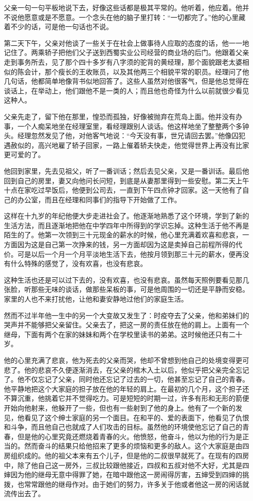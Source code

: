 \par 父亲一句一句平板地说下去，好像这些话都是极其平常的。他听着，他应着。他并不说他愿意或是不愿意。一个念头在他的脑子里打转：“一切都完了。”他的心里藏着不少的话，可是他一句话也不说。
\par 第二天下午，父亲对他谈了一些关于在社会上做事待人应取的态度的话，他一一地记住了。两乘轿子把他们父子送到西蜀实业公司经营的商业场的后门。他跟着父亲走到事务所去，见了那个四十多岁有八字须的驼背的黄经理，那个面貌跟老太婆相似的陈会计，那个瘦长的王收账员，以及其他两三个相貌平常的职员。经理问了他几句话，他都简单地像背书似地回答了。这些人虽然对他很客气，但是他总觉得在谈话上，在举动上，他们跟他不是一类的人；而且他也奇怪为什么以前就很少看见这种人。
\par 父亲先走了，留下他在那里，惶恐而孤独，好像被抛弃在荒岛上面。他并没有办事，一个人痴呆地坐在经理室里，看经理跟别人谈话。他这样地坐了整整两个多钟头。经理忽然发见了他，对他客气地说：“今天没有事，世兄请回去罢。”他像囚犯遇赦似的，高兴地雇了轿子回家，一路上催着轿夫快走，他觉得世界上再没有比家更可爱的了。
\par 他回到家里，先去见祖父，听了一番训话；然后去见父亲，又是一番训话。最后他回到自己的房里，妻又向他问长问短，到底是从妻那里得到一些安慰。第二天上午十点在家吃过早饭后，他便到公司去，一直到下午四点钟才回家。这一天他有了自己的办公室，而且在经理和同事们的指导下开始做了工作。
\par 这样在十九岁的年纪他便大步走进社会了。他逐渐地熟悉了这个环境，学到了新的生活方法，而且逐渐地把他在中学四年中所得到的学识忘掉。这种生活于他不再是陌生的了。他第一次领到三十元现金的薪水的时候，他心里充满着欢喜和悲哀，一方面因为这是自己第一次挣来的钱，另一方面却因为这是卖掉自己前程所得的代价。可是以后一个月一个月平淡地生活下去，他按月领到那三十元的薪水，便再没有什么特殊的感觉了，没有欢喜，也没有悲哀。
\par 这种生活也还是可以过下去的，没有欢喜，也没有悲哀。虽然每天照例要看见那几张脸，听那些无味的谈话，做那些呆板的事，可是他周围的一切还是平静而安稳。家里的人也不来打扰他，让他和妻安静地过他们的家庭生活。
\par 然而不过半年他一生中的另一个大变故又发生了：时疫夺去了父亲，他和弟妹们的哭声并不能够把父亲留住。父亲去了，把这一房的责任放在他的肩上。上面有一个继母，下面有两个在家的妹妹和两个在学校里读书的弟弟。这时候他还只有二十岁。
\par 他的心里充满了悲哀，他为死去的父亲而哭，他却不曾想到他自己的处境变得更可悲了。他的悲哀不久便逐渐消去，在父亲的棺木入土以后，他似乎把父亲完全忘记了。他不仅忘记了父亲，同时他还忘记了过去的一切，他甚至忘记了自己的青春。他平静地把这个大家庭的担子放在他的年轻的肩上。在最初的几个月，这个担子还不算沉重，他挑着它并不觉得吃力。可是短短的时期一过，许多有形和无形的箭便开始向他射来，他躲开了一些，但也有一些射到了他的身上。他有了一个新的发见，他看见了这个绅士家庭的另一个面目。在和平的、爱的表面下，他看见了仇恨和斗争，而且他自己也就成了人们攻击的目标。虽然他的环境使他忘记了自己的青春，但是他的心里究竟还燃烧着青春的火。他愤怒，他奋斗，他以为他的行为是正当的。然而奋斗的结果只给他招来了更多的烦恼和更多的敌人。这个大家庭是由四房组织成的。他的祖父本来有五个儿子，但是他的二叔很早就死了。在现有的四房中，除了他自己这一房外，三叔比较跟他接近，四叔和五叔对他不大好，尤其是四婶因为他的继母无意中得罪了她，在暗中跟他这一房闹得厉害，五婶受到四婶的挑拨，也常常跟他的继母作对。由于她们的努力，许多关于他或者他这一房的闲话就流传出去了。

